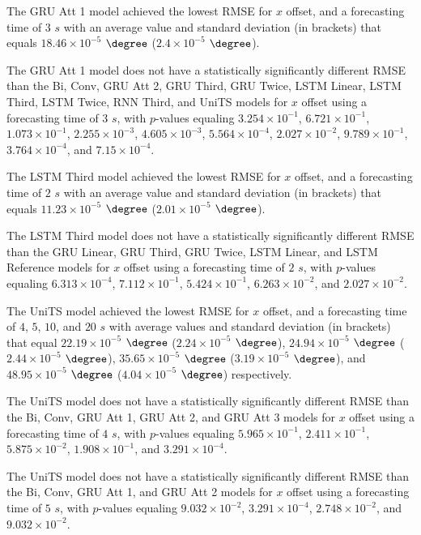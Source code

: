 The GRU Att 1 model achieved the lowest RMSE for $x$ offset, and a forecasting time of $3$ $s$ with an average value and standard deviation (in brackets) that equals $18.46 \times 10^{-5}$ $\degree$ ($2.4 \times 10^{-5}$ $\degree$).

The GRU Att 1 model does not have a statistically significantly different RMSE than the Bi, Conv, GRU Att 2, GRU Third, GRU Twice, LSTM Linear, LSTM Third, LSTM Twice, RNN Third, and UniTS models for $x$ offset using a forecasting time of $3$ $s$, with $p$-values equaling $3.254 \times 10^{-1}$, $6.721 \times 10^{-1}$, $1.073 \times 10^{-1}$, $2.255 \times 10^{-3}$, $4.605 \times 10^{-3}$, $5.564 \times 10^{-4}$, $2.027 \times 10^{-2}$, $9.789 \times 10^{-1}$, $3.764 \times 10^{-4}$, and $7.15 \times 10^{-4}$.

The LSTM Third model achieved the lowest RMSE for $x$ offset, and a forecasting time of $2$ $s$ with an average value and standard deviation (in brackets) that equals $11.23 \times 10^{-5}$ $\degree$ ($2.01 \times 10^{-5}$ $\degree$).

The LSTM Third model does not have a statistically significantly different RMSE than the GRU Linear, GRU Third, GRU Twice, LSTM Linear, and LSTM Reference models for $x$ offset using a forecasting time of $2$ $s$, with $p$-values equaling $6.313 \times 10^{-4}$, $7.112 \times 10^{-1}$, $5.424 \times 10^{-1}$, $6.263 \times 10^{-2}$, and $2.027 \times 10^{-2}$.

The UniTS model achieved the lowest RMSE for $x$ offset, and a forecasting time of $4$, $5$, $10$, and $20$ $s$ with average values and standard deviation (in brackets) that equal $22.19 \times 10^{-5}$ $\degree$ ($2.24 \times 10^{-5}$ $\degree$), $24.94 \times 10^{-5}$ $\degree$ ($2.44 \times 10^{-5}$ $\degree$), $35.65 \times 10^{-5}$ $\degree$ ($3.19 \times 10^{-5}$ $\degree$), and $48.95 \times 10^{-5}$ $\degree$ ($4.04 \times 10^{-5}$ $\degree$) respectively.

The UniTS model does not have a statistically significantly different RMSE than the Bi, Conv, GRU Att 1, GRU Att 2, and GRU Att 3 models for $x$ offset using a forecasting time of $4$ $s$, with $p$-values equaling $5.965 \times 10^{-1}$, $2.411 \times 10^{-1}$, $5.875 \times 10^{-2}$, $1.908 \times 10^{-1}$, and $3.291 \times 10^{-4}$.

The UniTS model does not have a statistically significantly different RMSE than the Bi, Conv, GRU Att 1, and GRU Att 2 models for $x$ offset using a forecasting time of $5$ $s$, with $p$-values equaling $9.032 \times 10^{-2}$, $3.291 \times 10^{-4}$, $2.748 \times 10^{-2}$, and $9.032 \times 10^{-2}$.

